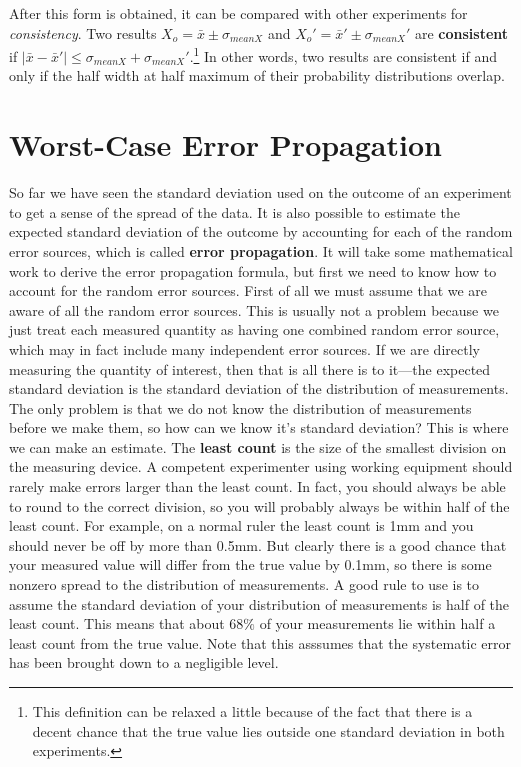 After this form is obtained, it can be compared with other experiments for \textit{consistency}. Two results $X_o = \bar{x} \pm \sigma_{mean X}$ and $X_o' = \bar{x}' \pm \sigma_{mean X}'$ are \textbf{consistent} if  $|\bar{x} - \bar{x}'| \leq \sigma_{mean X} + \sigma_{mean X}'$.\footnote{This definition can be relaxed a little because of the fact that there is a decent chance that the true value lies outside one standard deviation in both experiments.}
In other words, two results are consistent if and only if the half width at half maximum of their probability distributions overlap. 



\section{Worst-Case Error Propagation}
So far we have seen the standard deviation used on the outcome of an experiment to get a sense of the spread of the data. It is also possible to estimate the expected standard deviation of the outcome by accounting for each of the random error sources, which is called \textbf{error propagation}. It will take some mathematical work to derive the error propagation formula, but first we need to know how to account for the random error sources. First of all we must assume that we are aware of all the random error sources. This is usually not a problem because we just treat each measured quantity as having one combined random error source, which may in fact include many independent error sources. If we are directly measuring the quantity of interest, then that is all there is to it---the expected standard deviation is the standard deviation of the distribution of measurements. The only problem is that we do not know the distribution of measurements before we make them, so how can we know it's standard deviation? This is where we can make an estimate. The \textbf{least count} is the size of the smallest division on the measuring device. A competent experimenter using working equipment should rarely make errors larger than the least count. In fact, you should always be able to round to the correct division, so you will probably always be within half of the least count. For example, on a normal ruler the least count is 1mm and you should never be off by more than 0.5mm. But clearly there is a good chance that your measured value will differ from the true value by 0.1mm, so there is some nonzero spread to the distribution of measurements. A good rule to use is to assume the standard deviation of your distribution of measurements is half of the least count. This means that about $68\%$ of your measurements lie within half a least count from the true value. Note that this asssumes that the systematic error has been brought down to a negligible level.

